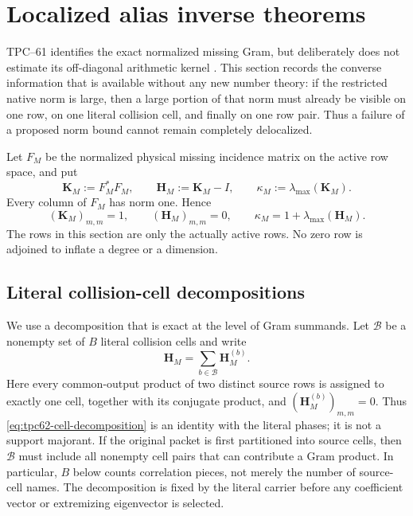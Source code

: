 \section{Localized alias inverse theorems}
\label{sec:tpc62-localized-alias}

TPC--61 identifies the exact normalized missing Gram, but deliberately does
not estimate its off-diagonal arithmetic kernel \citep{WangTPC61}.  This
section records the converse information that is available without any new
number theory: if the restricted native norm is large, then a large portion
of that norm must already be visible on one row, on one literal collision
cell, and finally on one row pair.  Thus a failure of a proposed norm bound
cannot remain completely delocalized.

Let \(F_M\) be the normalized physical missing incidence matrix on the
active row space, and put
\begin{equation}
 \mathbf K_M:=F_M^*F_M,
 \qquad
 \mathbf H_M:=\mathbf K_M-I,
 \qquad
 \kappa_M:=\lambda_{\max}(\mathbf K_M).
 \label{eq:tpc62-normalized-alias-gram}
\end{equation}
Every column of \(F_M\) has norm one.  Hence
\begin{equation}
 (\mathbf K_M)_{m,m}=1,
 \qquad
 (\mathbf H_M)_{m,m}=0,
 \qquad
 \kappa_M=1+\lambda_{\max}(\mathbf H_M).
 \label{eq:tpc62-zero-diagonal-alias}
\end{equation}
The rows in this section are only the actually active rows.  No zero row is
adjoined to inflate a degree or a dimension.

\subsection{Literal collision-cell decompositions}

We use a decomposition that is exact at the level of Gram summands.  Let
\(\mathscr B\) be a nonempty set of \(B\) literal collision cells and write
\begin{equation}
 \mathbf H_M=\sum_{b\in\mathscr B}\mathbf H_M^{(b)}.
 \label{eq:tpc62-cell-decomposition}
\end{equation}
Here every common-output product of two distinct source rows is assigned to
exactly one cell, together with its conjugate product, and
\((\mathbf H_M^{(b)})_{m,m}=0\).  Thus
\eqref{eq:tpc62-cell-decomposition} is an identity with the literal phases;
it is not a support majorant.  If the original packet is first partitioned
into source cells, then \(\mathscr B\) must include all nonempty cell pairs
that can contribute a Gram product.  In particular, \(B\) below counts
correlation pieces, not merely the number of source-cell names.  The
decomposition is fixed by the literal carrier before any coefficient vector
or extremizing eigenvector is selected.

